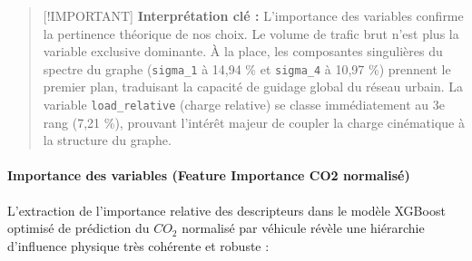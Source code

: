 \documentclass[10pt, a4paper]{article}
\begin{document}
\begin{quote}
{[}!IMPORTANT{]} \textbf{Interprétation clé :} L'importance des
variables confirme la pertinence théorique de nos choix. Le volume de
trafic brut n'est plus la variable exclusive dominante. À la place, les
composantes singulières du spectre du graphe (\texttt{sigma\_1} à 14,94
\% et \texttt{sigma\_4} à 10,97 \%) prennent le premier plan, traduisant
la capacité de guidage global du réseau urbain. La variable
\texttt{load\_relative} (charge relative) se classe immédiatement au 3e
rang (7,21 \%), prouvant l'intérêt majeur de coupler la charge
cinématique à la structure du graphe.
\end{quote}

\newpage

\paragraph{Importance des variables (Feature Importance CO2
normalisé)}\label{importance-des-variables-feature-importance-co2-normalisuxe9}

L'extraction de l'importance relative des descripteurs dans le modèle
XGBoost optimisé de prédiction du \(CO_2\) normalisé par véhicule révèle
une hiérarchie d'influence physique très cohérente et robuste :
\end{document}
